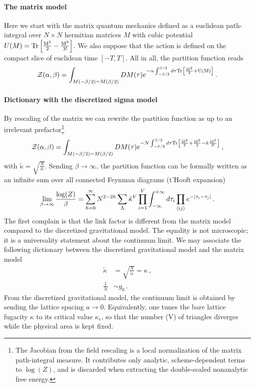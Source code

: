 \documentclass[a4paper]{article}
\begin{document}
\paragraph{The matrix model}
Here we start with the matrix quantum mechanics defined as a euclidean path-integral over $N\times N$ hermitian matrices $M$ with cubic potential $U(M) = \rm{Tr}\left[\frac{M^2}{2}-\frac{M^3}{3!}\right]$. We also suppose that the action is defined on the compact slice of euclidean time $[-T,T]$. All in all, the partition function reads
\begin{equation}
  \mathcal{Z}(\alpha,\beta) = \int_{M(-\beta/2)=M(\beta/2)} DM(\tau) e^{-\alpha\int_{-\beta/2}^{\beta/2} d\tau \rm{Tr}\left[\frac{\dot{M}^2}{2}+ U(M)\right]}\,.
\end{equation}
\paragraph{Dictionary with the discretized sigma model}
By rescaling of the matrix we can rewrite the partition function as up to an irrelevant prefactor\footnote{The Jacobian from the field rescaling is a local normalization of the matrix path-integral measure. It contributes only analytic, scheme-dependent terms to $\log (Z)$, and is discarded when extracting the double-scaled nonanalytic free energy.}
\begin{equation}
  \mathcal{Z}(\alpha,\beta) = \int_{M(-\beta/2)=M(\beta/2)} DM(\tau) e^{-N\int_{-\beta/2}^{\beta/2} d\tau \rm{Tr}\left[\frac{\dot{M}^2}{2} + \frac{M^2}{2}-\tilde{\kappa}\frac{M^3}{3!}\right]}\,,
\end{equation}
with $\tilde{\kappa}=\sqrt{\frac{N}{\alpha}}$. Sending $\beta \to \infty$, the partition function can be formally written as an infinite sum over all  connected Feynman diagrams (t'Hooft expansion)
\begin{equation}
  \lim_{\beta\to\infty}\frac{\log(Z)}{\beta} =\sum_{h=0}^{\infty}N^{2-2h}\sum_{\Lambda}\tilde{\kappa}^V \prod_{i=1}^V \int_{-\infty}^{+\infty} d\tau_i \prod_{\braket{ij}} e^{-|\tau_i-\tau_j|}\,.
\end{equation}
The first complain is that the link factor is different from the matrix model compared to the discretized gravitational model. The equality is not microscopic; it is a universality statement about the continuum limit. We may associate the following dictionary between the discretized gravitational model and the matrix model
\begin{equation}
  \begin{aligned}
    \tilde{\kappa} &= \sqrt{\frac{N}{\alpha}} = \kappa\,,\\
    \frac{1}{N} &\sim g_0\,. 
  \end{aligned}
\end{equation}
From the discretized gravitational model, the continuum limit is obtained by sending the lattice spacing $a\to 0$. Equivalently, one tunes the bare lattice fugacity $\kappa$ to its critical value $\kappa_c$, so that the number (V) of triangles diverges while the physical area is kept fixed.
\end{document}
